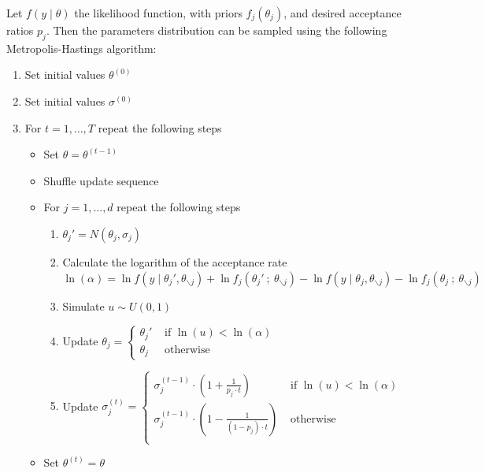 \documentclass[11pt,fleqn]{book} %
\begin{document}
\begin{algorithm} 
	\label{alg:bimh}
	Let $f(y \mid \theta)$ the likelihood function, with priors $f_j(\theta_j)$,
	and desired acceptance ratios $p_j$. Then the parameters distribution
	can be sampled using the following Metropolis-Hastings algorithm:
	\begin{enumerate}
		\item Set initial values $\theta^{(0)}$
		\item Set initial values $\sigma^{(0)}$
		\item For $t=1,\dots,T$ repeat the following steps
		\begin{itemize}
			\item Set $\theta=\theta^{(t-1)}$
			\item Shuffle update sequence
			\item For $j=1,\dots,d$ repeat the following steps
			\begin{enumerate}[label=\alph*.]
				\item $\theta_j' = N(\theta_j,\sigma_j)$
				\item Calculate the logarithm of the acceptance rate \\
				$\ln(\alpha) = 
					\ln f(y \mid \theta_j',\theta_{\backslash j}) + 
					\ln f_j(\theta_j'\ ;\ \theta_{\backslash j}) - 
					\ln f(y \mid \theta_j,\theta_{\backslash j}) - 
					\ln f_j(\theta_j\ ; \ \theta_{\backslash j})
				$
				\item Simulate $u \sim U(0,1)$
				\item Update $\theta_j=\left\{
				\begin{array}{ll}
					\theta_j' & \text{ if } \ln(u) < \ln(\alpha) \\
					\theta_j  & \text{ otherwise }               
				\end{array}\right.$ 
				\item Update $\sigma_j^{(t)} = \left\{
					\begin{array}{ll}
						\sigma_j^{(t-1)} \cdot \left( 1 + \frac{1}{p_j \cdot t} \right) & \text{ if } \ln(u) < \ln(\alpha) \\
						\sigma_j^{(t-1)} \cdot \left( 1 - \frac{1}{(1-p_j) \cdot t} \right) & \text{ otherwise } \\
					\end{array}
				\right.$
			\end{enumerate}
			\item Set $\theta^{(t)}=\theta$
		\end{itemize}
	\end{enumerate}
\end{algorithm}
\end{document}
